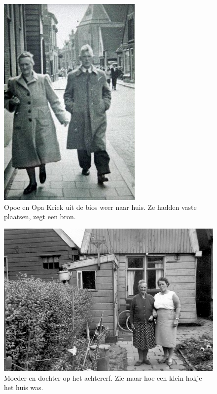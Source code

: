 \documentclass[12pt,twoside]{memoir}
\begin{document}
\begin{figure}
\includegraphics[width=\textwidth]{img/ch3/vandebios}
\caption*{\footnotesize Opoe en Opa Kriek uit de bios weer naar huis. Ze hadden vaste plaatsen, zegt een bron.}
\end{figure}

\begin{figure}
\includegraphics[width=\textwidth]{img/ch3/opoe82jr}
\caption*{\footnotesize Moeder en dochter op het achtererf. Zie maar hoe een klein hokje het huis was.}
\end{figure}
\end{document}
